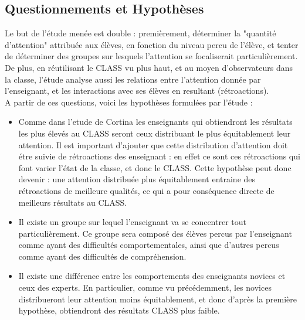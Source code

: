 \documentclass{article}
\begin{document}
\subsection{Questionnements et Hypothèses}
Le but de l'étude menée est double : premièrement, déterminer la "quantité d'attention" attribuée aux élèves, en fonction du niveau percu de l'élève, et tenter de déterminer des groupes sur lesquels l'attention se focaliserait particulièrement. De plus, en réutilisant le CLASS vu plus haut, et au moyen d'observateurs dans la classe, l'étude analyse aussi les relations entre l'attention donnée par l'enseignant, et les interactions avec ses élèves en resultant (rétroactions).\\
A partir de ces questions, voici les hypothèses formulées par l'étude :
\begin{itemize}
  \item Comme dans l'etude de Cortina \cite{Cortina} les enseignants qui obtiendront les résultats les plus élevés au CLASS seront ceux distribuant le plus équitablement leur attention. Il est important d'ajouter que cette distribution d'attention doit étre suivie de rétroactions des enseignant : en effet ce sont ces rétroactions qui font varier l'état de la classe, et donc le CLASS. Cette hypothèse peut donc devenir : une attention distribuée plus équitablement entraine des rétroactions de meilleure qualités, ce qui a pour conséquence directe de meilleurs résultats au CLASS.
  \item Il existe un groupe sur lequel l'enseignant va se concentrer tout particulièrement. Ce groupe sera composé des élèves percus par l'enseignant comme ayant des difficultés comportementales, ainsi que d'autres percus comme ayant des difficultés de compréhension.
  \item Il existe une différence entre les comportements des enseignants novices et ceux des experts. En particulier, comme vu précédemment, les novices distribueront leur attention moins équitablement, et donc d'après la première hypothèse, obtiendront des résultats CLASS plus faible.
\end{itemize}
\end{document}
